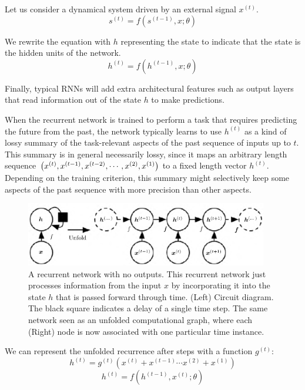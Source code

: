 \documentclass{report}
\begin{document}
Let us consider a dynamical system driven by an external signal $x^{(t)}$.
$$s^{(t)} = f(s^{(t-1)}, x; \theta)$$

We rewrite  the equation with $h$ representing the state to indicate that the state is the hidden
units of the network.
$$h^{(t)} = f(h^{(t-1)}, x; \theta)$$

Finally, typical RNNs will add extra architectural features such as output layers that read information out of the state $h$ to make predictions.

When the recurrent network is trained to perform a task that requires predicting the future from the past, the network typically learns to use $h^{(t)}$ as a kind of lossy summary of the task-relevant aspects of the past sequence of inputs up to $t$. This summary is in general necessarily lossy, since it maps an arbitrary length sequence $\left( x^{(t)}, x^{(t-1)}, x^{(t-2)}, \cdots, x^{(2)}, x^{(1)}\right)$ to a fixed length vector $h^{(t)}$. Depending on the training criterion, this summary might selectively keep some aspects of the past sequence with more precision than other aspects.

\begin{figure}[ht]
	\includegraphics[width=300pt]{35}
\centering
\caption{A recurrent network with no outputs. This recurrent network just processes information from the input $x$ by incorporating it into the state $h$ that is passed forward through time. (Left) Circuit diagram. The black square indicates a delay of a single time step. The same network seen as an unfolded computational graph, where each (Right) node is now associated with one particular time instance.}
\end{figure}

We can represent the unfolded recurrence after steps with a function $g^{(t)}$:
$$h^{(t)} = g^{(t)} ( x^{(t)} + x^{(t-1)} \cdots x^{(2)} + x^{(1)})$$
$$h^{(t)} = f(h^{(t - 1)}, x^{(t)}; \theta)$$
\end{document}
